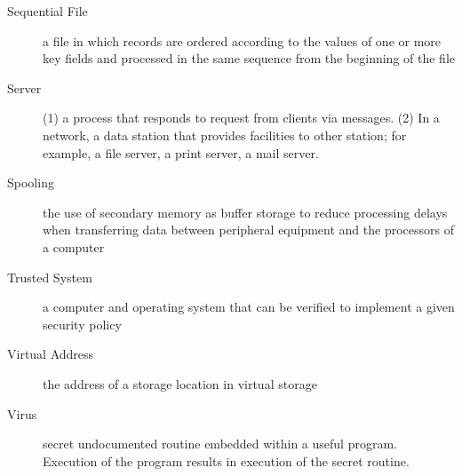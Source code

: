\documentclass[9pt,landscape]{memoir}
\begin{document}
\begin{multicols}{6}
\begin{description}
    \item[Sequential File] a file in which records are ordered according to the values of one or more key fields and processed in the same sequence from the beginning of the file
    \item[Server] (1) a process that responds to request from clients via messages.  (2) In a network, a data station that provides facilities to other station; for example, a file server, a print server, a mail server.
    \item[Spooling] the use of secondary memory as buffer storage to reduce processing delays when transferring data between peripheral equipment and the processors of a computer

    \item[Trusted System] a computer and operating system that can be verified to implement a given security policy
    \item[Virtual Address] the address of a storage location in virtual storage
    \item[Virus] secret undocumented routine embedded within a useful program.  Execution of the program results in execution of the secret routine.
\end{description}


\end{multicols}
\end{document}
